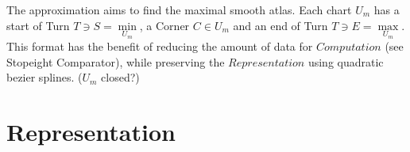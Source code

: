 \documentclass{report}
\begin{document}
\iffalse
Within $f$ we are assigning a sequence of three points to compact Hausdorf invervals ~\cite[\nopp 6.1.3.]{Mortad}:
\begin{equation}
\{x_{n}\}_{n \in \mathbb{N}} \mapsto \{S,C,E\}
\end{equation}\\
\fi
The approximation aims to find the maximal smooth atlas. Each chart $U_{m}$ has a start of Turn $T \ni S = \min \limits _{U_{m}}$, a Corner $C \in U_{m}$ and an end of Turn $T \ni E = \max \limits _{U_{m}}$. This format has the benefit of reducing the amount of data for $Computation$ (see Stopeight Comparator), while preserving the $Representation$ using quadratic bezier splines. ($U_{m}$ closed?)

\chapter{Representation}
\end{document}
